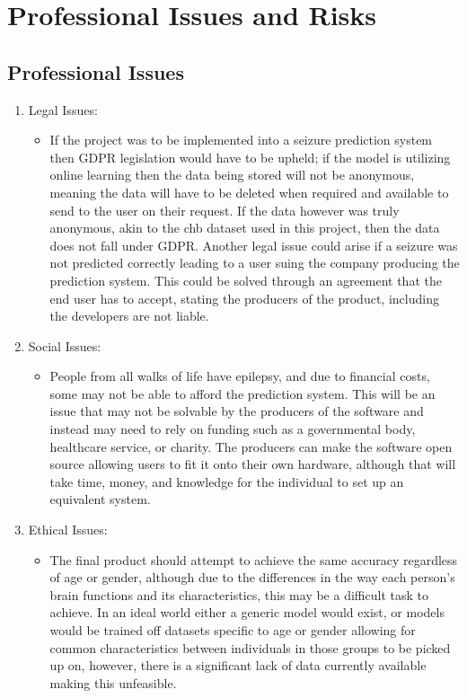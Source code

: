\documentclass[12pt]{article}
\begin{document}
\section{Professional Issues and Risks}

\subsection{Professional Issues}\label{issues}

\begin{enumerate}
    \item Legal Issues:
    \begin{itemize}
        \item If the project was to be implemented into a seizure prediction system then GDPR legislation would have to be upheld; if the model is utilizing online learning then the data being stored will not be anonymous, meaning the data will have to be deleted when required and available to send to the user on their request. If the data however was truly anonymous, akin to the \acrshort{chb} dataset used in this project, then the data does not fall under GDPR.
Another legal issue could arise if a seizure was not predicted correctly leading to a user suing the company producing the prediction system. This could be solved through an agreement that the end user has to accept, stating the producers of the product, including the developers are not liable.
    \end{itemize}
    \item Social Issues:
    \begin{itemize}
    	 \item People from all walks of life have epilepsy, and due to financial costs, some may not be able to afford the prediction system. This will be an issue that may not be solvable by the producers of the software and instead may need to rely on funding such as a governmental body, healthcare service, or charity. The producers can make the software open source allowing users to fit it onto their own hardware, although that will take time, money, and knowledge for the individual to set up an equivalent system.
    \end{itemize}
        \item Ethical Issues:
    \begin{itemize}
    	 \item The final product should attempt to achieve the same accuracy regardless of age or gender, although due to the differences in the way each person's brain functions and its characteristics, this may be a difficult task to achieve. In an ideal world either a generic model would exist, or models would be trained off datasets specific to age or gender allowing for common characteristics between individuals in those groups to be picked up on, however, there is a significant lack of data currently available making this unfeasible.

\end{itemize}
\end{enumerate}
\end{document}
